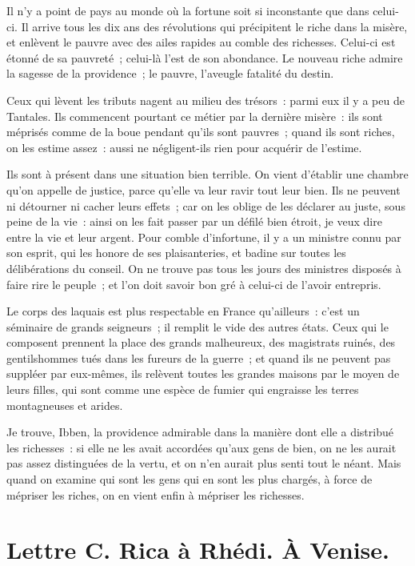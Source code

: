 \documentclass[french,twoside]{book} %
\newcommand{\dateline}[1]{\medskip{\RaggedLeft{#1}\par}\bigskip}
\begin{document}
\noindent Il n’y a point de pays au monde où la fortune soit si inconstante que dans celui-ci. Il arrive tous les dix ans des révolutions qui précipitent le riche dans la misère, et enlèvent le pauvre avec des ailes rapides au comble des richesses. Celui-ci est étonné de sa pauvreté ; celui-là l’est de son abondance. Le nouveau riche admire la sagesse de la providence ; le pauvre, l’aveugle fatalité du destin.\par
Ceux qui lèvent les tributs nagent au milieu des trésors : parmi eux il y a peu de Tantales. Ils commencent pourtant ce métier par la dernière misère : ils sont méprisés comme de la boue pendant qu’ils sont pauvres ; quand ils sont riches, on les estime assez : aussi ne négligent-ils rien pour acquérir de l’estime.\par
Ils sont à présent dans une situation bien terrible. On vient d’établir une chambre qu’on appelle de justice, parce qu’elle va leur ravir tout leur bien. Ils ne peuvent ni détourner ni cacher leurs effets ; car on les oblige de les déclarer au juste, sous peine de la vie : ainsi on les fait passer par un défilé bien étroit, je veux dire entre la vie et leur argent. Pour comble d’infortune, il y a un ministre connu par son esprit, qui les honore de ses plaisanteries, et badine sur toutes les délibérations du conseil. On ne trouve pas tous les jours des ministres disposés à faire rire le peuple ; et l’on doit savoir bon gré à celui-ci de l’avoir entrepris.\par
Le corps des laquais est plus respectable en France qu’ailleurs : c’est un séminaire de grands seigneurs ; il remplit le vide des autres états. Ceux qui le composent prennent la place des grands malheureux, des magistrats ruinés, des gentilshommes tués dans les fureurs de la guerre ; et quand ils ne peuvent pas suppléer par eux-mêmes, ils relèvent toutes les grandes maisons par le moyen de leurs filles, qui sont comme une espèce de fumier qui engraisse les terres montagneuses et arides.\par
Je trouve, Ibben, la providence admirable dans la manière dont elle a distribué les richesses : si elle ne les avait accordées qu’aux gens de bien, on ne les aurait pas assez distinguées de la vertu, et on n’en aurait plus senti tout le néant. Mais quand on examine qui sont les gens qui en sont les plus chargés, à force de mépriser les riches, on en vient enfin à mépriser les richesses.\par

\dateline{À Paris, le 26 de la lune de Maharram, 1717.}
\section[{Lettre C. Rica à Rhédi. À Venise.}]{Lettre C. Rica à Rhédi. À Venise.}\renewcommand{\leftmark}{Lettre C. Rica à Rhédi. À Venise.}
\end{document}
